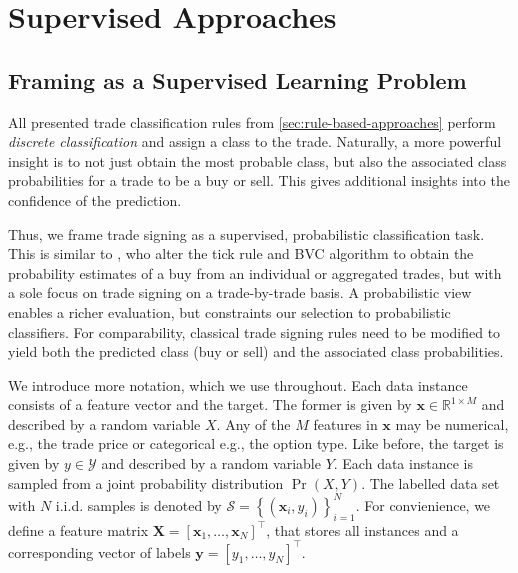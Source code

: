 \newpage
{}
\section{Supervised Approaches}\label{sec:supervised-approaches}


\subsection{Framing as a Supervised Learning Problem}\label{sec:problem-framing}

All presented trade classification rules from \cref{sec:rule-based-approaches}  perform \emph{discrete classification} and assign a class to the trade. Naturally, a more powerful insight is to not just obtain the most probable class, but also the associated class probabilities for a trade to be a buy or sell. This gives additional insights into the confidence of the prediction.

Thus, we frame trade signing as a supervised, probabilistic classification task. This is similar to \textcite[][272]{easleyDiscerningInformationTrade2016}, who alter the tick rule and \gls{BVC} algorithm to obtain the probability estimates of a buy from an individual or aggregated trades, but with a sole focus on trade signing on a trade-by-trade basis. A probabilistic view enables a richer evaluation, but constraints our selection to probabilistic classifiers. For comparability, classical trade signing rules need to be modified to yield both the predicted class (buy or sell) and the associated class probabilities.

We introduce more notation, which we use throughout. Each data instance consists of a feature vector and the target. The former is given by $\mathbf{x} \in \mathbb{R}^{1 \times M}$ and described by a random variable $X$. Any of the $M$ features in $\mathbf{x}$ may be numerical, e.g., the trade price or categorical e.g., the option type. Like before, the target is given by $y \in \mathcal{Y}$ and described by a random variable $Y$. Each data instance is sampled from a joint probability distribution $\Pr(X, Y)$. The labelled data set with $N$ i.i.d. samples is denoted by $\mathcal{S} =\left\{\left(\mathbf{x}_i, y_i\right)\right\}_{i=1}^N$. For convienience, we define a feature matrix $\mathbf{X}=\left[\mathbf{x}_1,\ldots, \mathbf{x}_N\right]^{\top}$, that stores all instances and a corresponding vector of labels $\mathbf{y}=\left[y_1,\ldots, y_N \right]^{\top}$.


